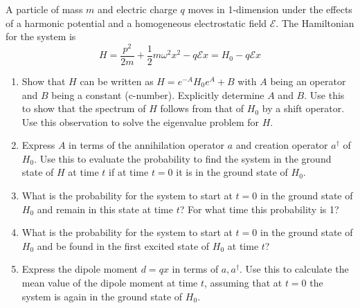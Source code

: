 \begin{exercise}
\label{physics:2025:3}
A particle of mass $m$ and electric charge $q$ moves in 1-dimension under the effects of a harmonic potential and a homogeneous electrostatic field $\mathcal{E}$. The Hamiltonian for the system is
\begin{equation}
    H = \frac{p^2}{2m} + \frac{1}{2}m\omega^2 x^2 - q \mathcal{E} x = H_0 - q \mathcal{E} x \tag{5}
\end{equation}

\begin{enumerate}
    \item Show that $H$ can be written as $H = e^{-A} H_0 e^A + B$ with $A$ being an operator and $B$ being a constant (c-number). Explicitly determine $A$ and $B$. Use this to show that the spectrum of $H$ follows from that of $H_0$ by a shift operator. Use this observation to solve the eigenvalue problem for $H$.
    \item Express $A$ in terms of the annihilation operator $a$ and creation operator $a^\dagger$ of $H_0$. Use this to evaluate the probability to find the system in the ground state of $H$ at time $t$ if at time $t=0$ it is in the ground state of $H_0$.
    \item What is the probability for the system to start at $t=0$ in the ground state of $H_0$ and remain in this state at time $t$? For what time this probability is 1?
    \item What is the probability for the system to start at $t=0$ in the ground state of $H_0$ and be found in the first excited state of $H_0$ at time $t$?
    \item Express the dipole moment $d = qx$ in terms of $a, a^\dagger$. Use this to calculate the mean value of the dipole moment at time $t$, assuming that at $t=0$ the system is again in the ground state of $H_0$.
\end{enumerate}
\end{exercise}

